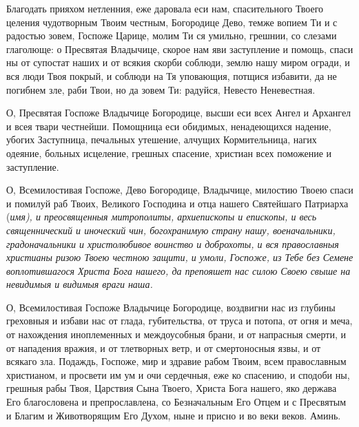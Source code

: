 Благодать прияхом нетленния, еже даровала еси нам, спасительного Твоего целения чудотворным Твоим честным, Богородице Дево, темже вопием Ти и с радостью зовем, Госпоже Царице, молим Ти ся умильно, грешнии, со слезами глаголюще: о Пресвятая Владычице, скорое нам яви заступление и помощь, спаси ны от супостат наших и от всякия скорби соблюди, землю нашу миром огради, и вся люди Твоя покрый, и соблюди на Тя уповающия, потщися избавити, да не погибнем зле, раби Твои, но да зовем Ти: радуйся, Невесто Неневестная.




О, Пресвятая Госпоже Владычице Богородице, высши еси всех Ангел и Архангел и всея твари честнейши. Помощница еси обидимых, ненадеющихся надение, убогих Заступница, печальных утешение, алчущих Кормительница, нагих одеяние, больных исцеление, грешных спасение, христиан всех поможение и заступление. 


О, Всемилостивая Госпоже, Дево Богородице, Владычице, милостию Твоею спаси и помилуй раб Твоих, Великого Господина и отца нашего Святейшаго Патриарха (\itshape имя\normalfont{}), и преосвященныя митрополиты, архиепископы и епископы, и весь священнический и иноческий чин, богохранимую страну нашу, военачальники, градоначальники и христолюбивое воинство и доброхоты, и вся православныя христианы ризою Твоею честною защити, и умоли, Госпоже, из Тебе без Семене воплотившагося Христа Бога нашего, да препояшет нас силою Своею свыше на невидимыя и видимыя враги наша. 

О, Всемилостивая Госпоже Владычице Богородице, воздвигни нас из глубины греховныя и избави нас от глада, губительства, от труса и потопа, от огня и меча, от нахождения иноплеменных и междоусобныя брани, и от напрасныя смерти, и от нападения вражия, и от тлетворных ветр, и от смертоносныя язвы, и от всякаго зла. Подаждь, Госпоже, мир и здравие рабом Твоим, всем православным христианом, и просвети им ум и очи сердечныя, еже ко спасению, и сподоби ны, грешныя рабы Твоя, Царствия Сына Твоего, Христа Бога нашего, яко держава Его благословена и препрославлена, со Безначальным Его Отцем и с Пресвятым и Благим и Животворящим Его Духом, ныне и присно и во веки веков. Аминь.
\mychapterending



